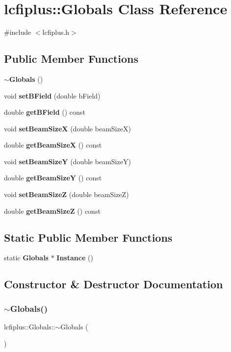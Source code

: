 \section{lcfiplus\+:\+:Globals Class Reference}
\label{classlcfiplus_1_1Globals}


{\ttfamily \#include $<$lcfiplus.\+h$>$}

\subsection*{Public Member Functions}
\begin{DoxyCompactItemize}
\item 
\textbf{ $\sim$\+Globals} ()
\item 
void \textbf{ set\+B\+Field} (double b\+Field)
\item 
double \textbf{ get\+B\+Field} () const
\item 
void \textbf{ set\+Beam\+SizeX} (double beam\+SizeX)
\item 
double \textbf{ get\+Beam\+SizeX} () const
\item 
void \textbf{ set\+Beam\+SizeY} (double beam\+SizeY)
\item 
double \textbf{ get\+Beam\+SizeY} () const
\item 
void \textbf{ set\+Beam\+SizeZ} (double beam\+SizeZ)
\item 
double \textbf{ get\+Beam\+SizeZ} () const
\end{DoxyCompactItemize}
\subsection*{Static Public Member Functions}
\begin{DoxyCompactItemize}
\item 
static \textbf{ Globals} $\ast$ \textbf{ Instance} ()
\end{DoxyCompactItemize}


\subsection{Constructor \& Destructor Documentation}
\mbox{\label{classlcfiplus_1_1Globals_a043948548633bbad8901f04a6d771613}} 
\subsubsection{$\sim$\+Globals()}
{\footnotesize\ttfamily lcfiplus\+::\+Globals\+::$\sim$\+Globals (\begin{DoxyParamCaption}{ }\end{DoxyParamCaption})}



